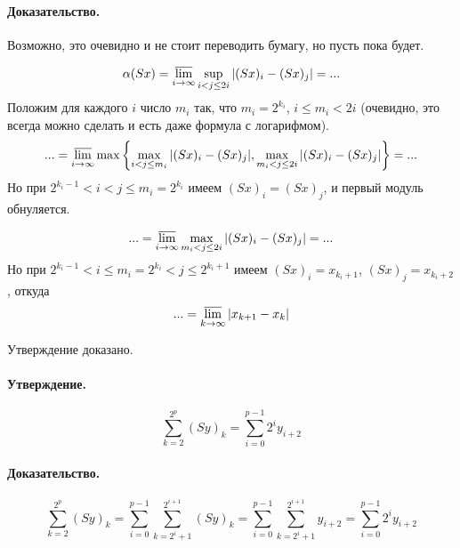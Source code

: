 \documentclass[a4paper,14pt]{article} %
\begin{document}
\paragraph{Доказательство.}
Возможно, это очевидно и не стоит переводить бумагу, но пусть пока будет.

\begin{equation*}
	\alpha(Sx) =
	\varlimsup_{i\to\infty} \sup_{i < j \leq 2i} | (Sx)_i - (Sx)_j | = ...
\end{equation*}
Положим для каждого $i$ число $m_i$ так,
что $m_i = 2^{k_i}$, $i \leq m_i < 2i$
(очевидно, это всегда можно сделать и есть даже формула с логарифмом).
\begin{equation*}
	... =
	\varlimsup_{i\to\infty} \max \left\{
		\max_{i   < j \leq m_i} | (Sx)_i - (Sx)_j |,
		\max_{m_i < j \leq 2i } | (Sx)_i - (Sx)_j |
	\right\} =
	...
\end{equation*}
Но при $2^{k_i - 1} < i < j \leq m_i = 2^{k_i}$
имеем $(Sx)_i = (Sx)_j$, и первый модуль обнуляется.

\begin{equation*}
	... =
	\varlimsup_{i\to\infty}
		\max_{m_i < j \leq 2i } | (Sx)_i - (Sx)_j |
	=
	...
\end{equation*}
Но при $2^{k_i - 1} < i \leq m_i = 2^{k_i} < j \leq 2^{k_i+1}$
имеем $(Sx)_i = x_{k_i+1}$, $(Sx)_j = x_{k_i+2}$, откуда
\begin{equation}\label{alpha_S_sosedi}
	... =
	\varlimsup_{k\to\infty}
		| x_{k+1} - x_k |
\end{equation}

Утверждение доказано.

\paragraph{Утверждение.}
\begin{equation}\label{summa_S_less}
	\sum_{k=2}^{2^p} (Sy)_k =
	\sum_{i=0}^{p-1} 2^i y_{i+2}
\end{equation}

\paragraph{Доказательство.}

\begin{equation*}
	\sum_{k=2}^{2^p} (Sy)_k =
	\sum_{i=0}^{p-1} \sum_{k=2^i+1}^{2^{i+1}} (Sy)_k =
	\sum_{i=0}^{p-1} \sum_{k=2^i+1}^{2^{i+1}} y_{i+2} =
	\sum_{i=0}^{p-1} 2^i y_{i+2}
\end{equation*}
\end{document}
